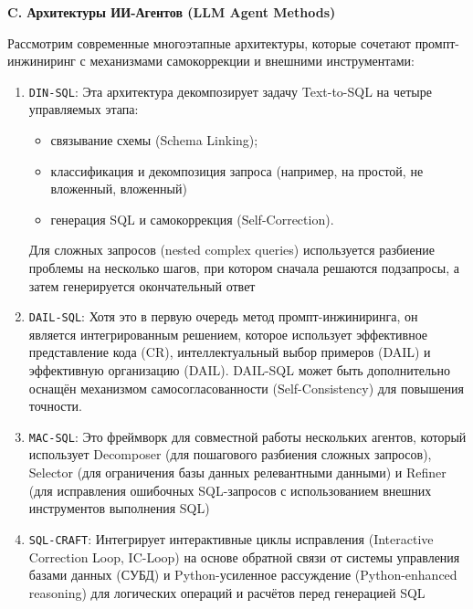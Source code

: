 \textbf{C. Архитектуры ИИ-Агентов (LLM Agent Methods)}

Рассмотрим современные многоэтапные архитектуры, которые сочетают промпт-инжиниринг с механизмами самокоррекции и внешними инструментами:

\begin{enumerate}
    \item \texttt{DIN-SQL}: Эта архитектура декомпозирует задачу Text-to-SQL на четыре управляемых этапа: 
    \begin{itemize}
        \item связывание схемы (Schema Linking);
        \item классификация и декомпозиция запроса (например, на простой, не вложенный, вложенный)
        \item  генерация SQL и самокоррекция (Self-Correction).
    \end{itemize} Для сложных запросов (nested complex queries) используется разбиение проблемы на несколько шагов, при котором сначала решаются подзапросы, а затем генерируется окончательный ответ

    \item \texttt{DAIL-SQL}: Хотя это в первую очередь метод промпт-инжиниринга, он является интегрированным решением, которое использует эффективное представление кода (CR), интеллектуальный выбор примеров (DAIL) и эффективную организацию (DAIL). DAIL-SQL может быть дополнительно оснащён механизмом самосогласованности (Self-Consistency) для повышения точности.
    
    \item \texttt{MAC-SQL}: Это фреймворк для совместной работы нескольких агентов, который использует Decomposer (для пошагового разбиения сложных запросов), Selector (для ограничения базы данных релевантными данными) и Refiner (для исправления ошибочных SQL-запросов с использованием внешних инструментов выполнения SQL)
    
    \item \texttt{SQL-CRAFT}: Интегрирует интерактивные циклы исправления (Interactive Correction Loop, IC-Loop) на основе обратной связи от системы управления базами данных (СУБД) и Python-усиленное рассуждение (Python-enhanced reasoning) для логических операций и расчётов перед генерацией SQL
\end{enumerate}



